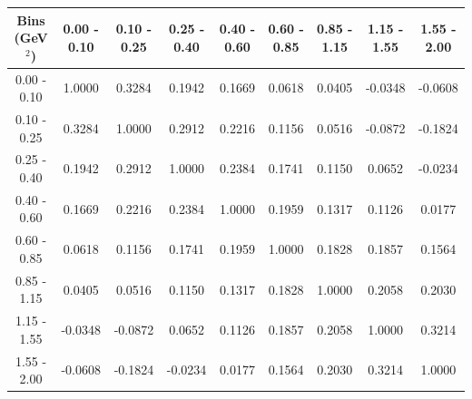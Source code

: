 \documentclass[aps, prd, reprint,showpacs,  preprintnumbers,amsmath,amssymb,superscriptaddress, nofootinbib]{revtex4-1}
\makeatletter
\renewenvironment{table}
  {\def\@captype{table}}
  {}
\makeatother
\begin{document}
\begin{table}
\centering
\begin{tabular}{ccccccccc}
\hline
Bins (GeV$^{2}$) &  0.00 - 0.10 &  0.10 - 0.25 &  0.25 - 0.40 &  0.40 - 0.60 &  0.60 - 0.85 &  0.85 - 1.15 &  1.15 - 1.55 &  1.55 - 2.00 \\ 
\hline
  0.00 -  0.10  & 1.0000  & 0.3284  & 0.1942  & 0.1669  & 0.0618  & 0.0405  &-0.0348  &-0.0608 \\
  0.10 -  0.25  & 0.3284  & 1.0000  & 0.2912  & 0.2216  & 0.1156  & 0.0516  &-0.0872  &-0.1824 \\
  0.25 -  0.40  & 0.1942  & 0.2912  & 1.0000  & 0.2384  & 0.1741  & 0.1150  & 0.0652  &-0.0234 \\
  0.40 -  0.60  & 0.1669  & 0.2216  & 0.2384  & 1.0000  & 0.1959  & 0.1317  & 0.1126  & 0.0177 \\
  0.60 -  0.85  & 0.0618  & 0.1156  & 0.1741  & 0.1959  & 1.0000  & 0.1828  & 0.1857  & 0.1564 \\
  0.85 -  1.15  & 0.0405  & 0.0516  & 0.1150  & 0.1317  & 0.1828  & 1.0000  & 0.2058  & 0.2030 \\
  1.15 -  1.55  &-0.0348  &-0.0872  & 0.0652  & 0.1126  & 0.1857  & 0.2058  & 1.0000  & 0.3214 \\
  1.55 -  2.00  &-0.0608  &-0.1824  &-0.0234  & 0.0177  & 0.1564  & 0.2030  & 0.3214  & 1.0000 \\
\hline
\hline
\end{tabular}
\caption{Correlation matrix for bins of $d\sigma/dQ^2$ for events with the selection $4.0 < E_{\nu} < 10.0$\,GeV.}
\label{tb:piz-Q2-cov}
\end{table}

\vspace{0.3cm}
\end{document}
